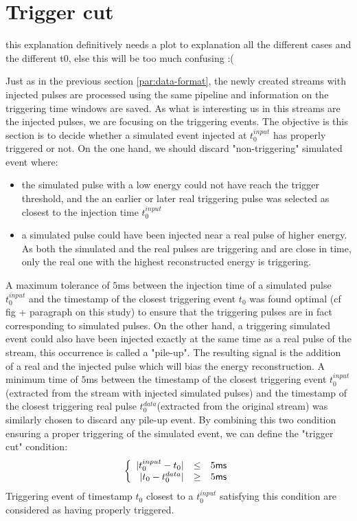\section{Trigger cut}
\label{par:livetime-cut}

{\color{red} this explanation definitively needs a plot to explanation all the different cases and the different t0, else this will be too much confusing :(}

Just as in the previous section \ref{par:data-format}, the newly created streams with injected pulses are processed using the same pipeline and information on the triggering time windows are saved.
As what is interesting us in this streams are the injected pulses, we are focusing on the triggering events.
The objective is this section is to decide whether a simulated event injected at $t_0^{input}$ has properly triggered or not.
On the one hand, we should discard "non-triggering" simulated event where:
\begin{itemize}
	\item the simulated pulse with a low energy could not have reach the trigger threshold, and the an earlier or later real triggering pulse was selected as closest to the injection time $t_0^{input}$
	\item a simulated pulse could have been injected near a real pulse of higher energy. As both the simulated and the real pulses are triggering and are close in time, only the real one with the highest reconstructed energy is triggering.
\end{itemize}
A maximum tolerance of $5$ms between the injection time of a simulated pulse $t_0^{input}$ and the timestamp of the closest triggering event $t_0$ was found optimal {\color{red}(cf fig + paragraph on this study)} to ensure that the triggering pulses are in fact corresponding to simulated pulses.
On the other hand, a triggering simulated event could also have been injected exactly at the same time as a real pulse of the stream, this occurrence is called a "pile-up". The resulting signal is the addition of a real and the injected pulse which will bias the energy reconstruction. A minimum time of $5$ms between the timestamp of the closest triggering event $t_0^{input}$(extracted from the stream with injected simulated pulses) and the timestamp of the closest triggering real pulse $t_0^{data}$(extracted from the original stream) was similarly chosen to discard any pile-up event.
By combining this two condition ensuring a proper triggering of the simulated event, we can define the "trigger cut" condition:
\begin{equation}
\left\{
\begin{array}{r c l}
| t_0^{input} - t_0 | &\leq& 5\textsf{ms}\\
| t_0 - t_0^{data} | &\geq& 5\textsf{ms}
\end{array}
\right.
\end{equation}
Triggering event of timestamp $t_0$ closest to a $t_0^{input}$ satisfying this condition are considered as having properly triggered.

